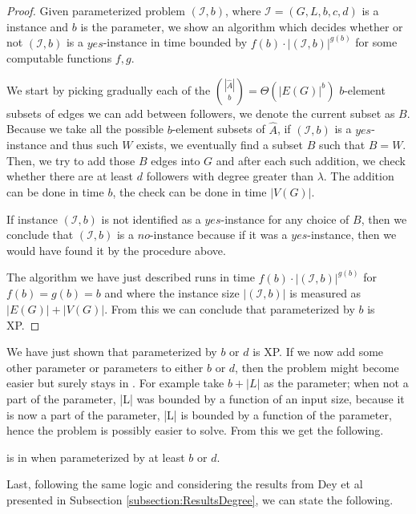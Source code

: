 \begin{proof}
    Given parameterized problem $(\mathcal{I}, b)$, where $\mathcal{I} = (G, L, b, c, d)$ is a \HLdeg instance and $b$ is the parameter,
    we show an algorithm which decides whether or not $(\mathcal{I}, b)$ is a $yes$-instance in time bounded by
    $f(b) \cdot |(\mathcal{I}, b)|^{g(b)}$ for some computable functions $f,g$.

    We start by picking gradually each of the $\binom{|\hat{A}|}{b} = \Theta(|E(G)|^b)$ $b$-element subsets of
    edges we can add between followers, we denote the current subset as $B$.
    Because we take all the possible $b$-element subsets of $\hat{A}$, if $(\mathcal{I}, b)$ is a $yes$-instance and
    thus such $W$ exists, we eventually find a subset $B$ such that $B = W$.
    Then, we try to add those $B$ edges into $G$ and after each such addition, we check whether there are at least $d$ followers
    with degree greater than $\lambda$. The addition can be done in time $b$, the check can be done in time $|V(G)|$.

    If instance $(\mathcal{I}, b)$ is not identified as a $yes$-instance for any choice of $B$,
    then we conclude that $(\mathcal{I}, b)$ is a $no$-instance because if it was a $yes$-instance,
    then we would have found it by the procedure above.

    The algorithm we have just described runs in time $f(b) \cdot |(\mathcal{I}, b)|^{g(b)}$ for $f(b) = g(b) = b$
    and where the instance size $|(\mathcal{I}, b)|$ is measured as $|E(G)| + |V(G)|$.
    From this we can conclude that \HL parameterized by $b$ is XP.
\end{proof}

We have just shown that \HL parameterized by $b$ or $d$ is XP.
If we now add some other parameter or parameters to either $b$ or $d$, then the problem
might become easier but surely stays in \XP.
For example take $b+|L|$ as the parameter;
when not a part of the parameter, |L| was bounded by a function of an input size,
because it is now a part of the parameter, |L| is bounded by a function of the parameter,
hence the problem is possibly easier to solve.
From this we get the following.

\begin{corollary}\label{cor:BD:variation:XP}
    \HL is in \XP when parameterized by at least $b$ or $d$.
\end{corollary}

Last, following the same logic and considering the results from Dey et al presented in Subsection \ref{subsection:ResultsDegree},
we can state the following.

